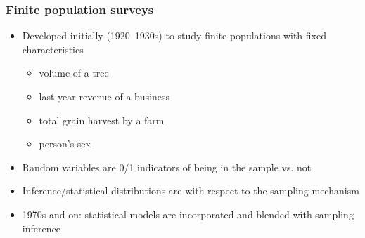 \documentclass{beamer}
\begin{document}
\begin{frame}\frametitle{Finite population surveys}

\begin{itemize}
    \item Developed initially (1920--1930s) to study finite populations with fixed characteristics
        \begin{itemize}
            \item volume of a tree
            \item last year revenue of a business
            \item total grain harvest by a farm
            \item person's sex
        \end{itemize}
    \item Random variables are 0/1 indicators of being in the sample vs. not
    \item Inference/statistical distributions are with respect to the sampling mechanism
    \item 1970s and on: statistical models are incorporated and blended with sampling inference
\end{itemize}

\end{frame}
\end{document}
